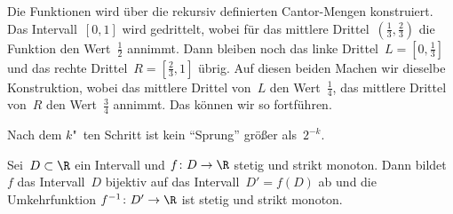 \documentclass[a4paper]{article}
\begin{document}
\begin{example}
\begin{enumerate}
        Die Funktionen wird über die rekursiv definierten Cantor-Mengen konstruiert. Das Intervall~$[0, 1]$ wird gedrittelt, wobei für das mittlere Drittel~$(\frac{1}{3},\frac{2}{3})$ die Funktion den Wert~$\frac{1}{2}$ annimmt. Dann bleiben noch das linke Drittel~$L = [0,\frac{1}{3}]$ und das rechte Drittel~$R = [\frac{2}{3},1]$ übrig. Auf diesen beiden Machen wir dieselbe Konstruktion, wobei das mittlere Drittel von~$L$ den Wert~$\frac{1}{4}$, das mittlere Drittel von~$R$ den Wert~$\frac{3}{4}$ annimmt. Das können wir so fortführen.
        \begin{center}
        \end{center}
        Nach dem $k$"~ten Schritt ist kein "`Sprung"' größer als~$2^{-k}$.
    \end{enumerate}
\end{example}

\begin{theorem}
    Sei~$D \subset \R$ ein Intervall und $f\colon D \to \R$ stetig und strikt monoton. Dann bildet~$f$ das Intervall~$D$ bijektiv auf das Intervall~$D' = f(D)$ ab und die Umkehrfunktion $f^{-1}\colon D' \to \R$ ist stetig und strikt monoton.
\end{theorem}
\end{document}
